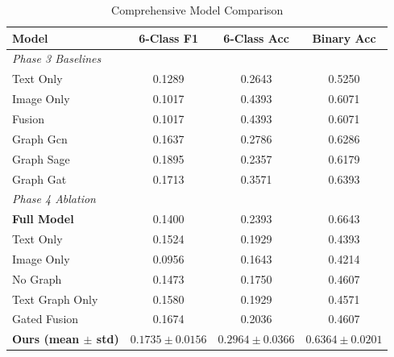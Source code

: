 \begin{table}[h]
\centering
\caption{Comprehensive Model Comparison}
\label{tab:results}
\begin{tabular}{lccc}
\hline
\textbf{Model} & \textbf{6-Class F1} & \textbf{6-Class Acc} & \textbf{Binary Acc} \\
\hline
\multicolumn{4}{l}{\textit{Phase 3 Baselines}} \\
  Text Only & 0.1289 & 0.2643 & 0.5250 \\
  Image Only & 0.1017 & 0.4393 & 0.6071 \\
  Fusion & 0.1017 & 0.4393 & 0.6071 \\
  Graph Gcn & 0.1637 & 0.2786 & 0.6286 \\
  Graph Sage & 0.1895 & 0.2357 & 0.6179 \\
  Graph Gat & 0.1713 & 0.3571 & 0.6393 \\
\hline
\multicolumn{4}{l}{\textit{Phase 4 Ablation}} \\
  \textbf{Full Model} & 0.1400 & 0.2393 & 0.6643 \\
  {Text Only} & 0.1524 & 0.1929 & 0.4393 \\
  {Image Only} & 0.0956 & 0.1643 & 0.4214 \\
  {No Graph} & 0.1473 & 0.1750 & 0.4607 \\
  {Text Graph Only} & 0.1580 & 0.1929 & 0.4571 \\
  {Gated Fusion} & 0.1674 & 0.2036 & 0.4607 \\
\hline
  \textbf{Ours (mean $\pm$ std)} & $0.1735 \pm 0.0156$ & $0.2964 \pm 0.0366$ & $0.6364 \pm 0.0201$ \\
\hline
\end{tabular}
\end{table}